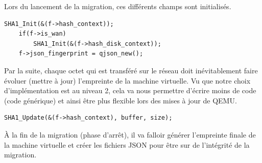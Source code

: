 Lors du lancement de la migration, ces différents champs sont initialisés.

\begin{lstlisting}[caption={Phase d'initialisation de la structure de donnée},captionpos=b]
    SHA1_Init(&(f->hash_context));
    if(f->is_wan)
        SHA1_Init(&(f->hash_disk_context));
    f->json_fingerprint = qjson_new();
\end{lstlisting}

Par la suite, chaque octet qui est transféré sur le réseau doit inévitablement faire évoluer (mettre à jour) l'empreinte de la machine virtuelle.
Vu que notre choix d'implémentation est au niveau 2, cela va nous permettre d'écrire moins de code (code générique) et ainsi être plus flexible lors des mises à jour de QEMU.

\begin{lstlisting}[caption={Mise à jour de l'empreinte de la machine virtuelle},captionpos=b]
SHA1_Update(&(f->hash_context), buffer, size);
\end{lstlisting}

À la fin de la migration (phase d'arrêt), il va falloir générer l'empreinte finale de la machine virtuelle et créer les fichiers JSON pour être sur de l'intégrité de la migration.

